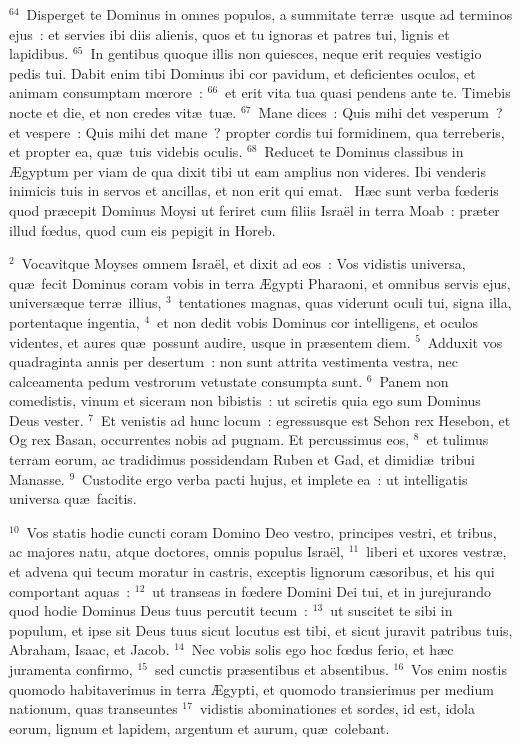 ${}^{64}$~Disperget te Dominus in omnes populos, a summitate terr\ae\ usque ad terminos ejus~: et servies ibi diis alienis, quos et tu ignoras et patres tui, lignis et lapidibus.
${}^{65}$~In gentibus quoque illis non quiesces, neque erit requies vestigio pedis tui. Dabit enim tibi Dominus ibi cor pavidum, et deficientes oculos, et animam consumptam mœrore~:
${}^{66}$~et erit vita tua quasi pendens ante te. Timebis nocte et die, et non credes vit\ae\ tu\ae .
${}^{67}$~Mane dices~: Quis mihi det vesperum~? et vespere~: Quis mihi det mane~? propter cordis tui formidinem, qua terreberis, et propter ea, qu\ae\ tuis videbis oculis.
${}^{68}$~Reducet te Dominus classibus in \AE gyptum per viam de qua dixit tibi ut eam amplius non videres. Ibi venderis inimicis tuis in servos et ancillas, et non erit qui emat.
~H\ae c sunt verba fœderis quod pr\ae cepit Dominus Moysi ut feriret cum filiis Isra\"el in terra Moab~: pr\ae ter illud fœdus, quod cum eis pepigit in Horeb.


${}^{2}$~Vocavitque Moyses omnem Isra\"el, et dixit ad eos~: Vos vidistis universa, qu\ae\ fecit Dominus coram vobis in terra \AE gypti Pharaoni, et omnibus servis ejus, univers\ae que terr\ae\ illius,
${}^{3}$~tentationes magnas, quas viderunt oculi tui, signa illa, portentaque ingentia,
${}^{4}$~et non dedit vobis Dominus cor intelligens, et oculos videntes, et aures qu\ae\ possunt audire, usque in pr\ae sentem diem.
${}^{5}$~Adduxit vos quadraginta annis per desertum~: non sunt attrita vestimenta vestra, nec calceamenta pedum vestrorum vetustate consumpta sunt.
${}^{6}$~Panem non comedistis, vinum et siceram non bibistis~: ut sciretis quia ego sum Dominus Deus vester.
${}^{7}$~Et venistis ad hunc locum~: egressusque est Sehon rex Hesebon, et Og rex Basan, occurrentes nobis ad pugnam. Et percussimus eos,
${}^{8}$~et tulimus terram eorum, ac tradidimus possidendam Ruben et Gad, et dimidi\ae\ tribui Manasse.
${}^{9}$~Custodite ergo verba pacti hujus, et implete ea~: ut intelligatis universa qu\ae\ facitis.


${}^{10}$~Vos statis hodie cuncti coram Domino Deo vestro, principes vestri, et tribus, ac majores natu, atque doctores, omnis populus Isra\"el,
${}^{11}$~liberi et uxores vestr\ae , et advena qui tecum moratur in castris, exceptis lignorum c\ae soribus, et his qui comportant aquas~:
${}^{12}$~ut transeas in fœdere Domini Dei tui, et in jurejurando quod hodie Dominus Deus tuus percutit tecum~:
${}^{13}$~ut suscitet te sibi in populum, et ipse sit Deus tuus sicut locutus est tibi, et sicut juravit patribus tuis, Abraham, Isaac, et Jacob.
${}^{14}$~Nec vobis solis ego hoc fœdus ferio, et h\ae c juramenta confirmo,
${}^{15}$~sed cunctis pr\ae sentibus et absentibus.
${}^{16}$~Vos enim nostis quomodo habitaverimus in terra \AE gypti, et quomodo transierimus per medium nationum, quas transeuntes
${}^{17}$~vidistis abominationes et sordes, id est, idola eorum, lignum et lapidem, argentum et aurum, qu\ae\ colebant.


